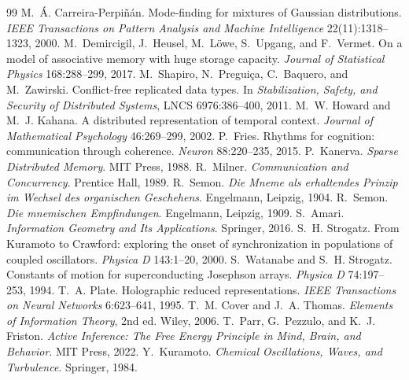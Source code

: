 \documentclass[11pt,twoside,openany]{book}
\theoremstyle{plain}
\theoremstyle{definition}
\theoremstyle{remark}
\theoremstyle{definition}
\begin{document}
\begin{thebibliography}{99}
 M.~\'A. Carreira-Perpi\~n\'an. Mode-finding for mixtures of Gaussian distributions. \emph{IEEE Transactions on Pattern Analysis and Machine Intelligence} 22(11):1318--1323, 2000.
 M.~Demircigil, J.~Heusel, M.~L\"owe, S.~Upgang, and F.~Vermet. On a model of associative memory with huge storage capacity. \emph{Journal of Statistical Physics} 168:288--299, 2017.
 M.~Shapiro, N.~Pregui\c{c}a, C.~Baquero, and M.~Zawirski. Conflict-free replicated data types. In \emph{Stabilization, Safety, and Security of Distributed Systems}, LNCS 6976:386--400, 2011.
 M.~W. Howard and M.~J. Kahana. A distributed representation of temporal context. \emph{Journal of Mathematical Psychology} 46:269--299, 2002.
 P.~Fries. Rhythms for cognition: communication through coherence. \emph{Neuron} 88:220--235, 2015.
 P.~Kanerva. \emph{Sparse Distributed Memory}. MIT Press, 1988.
 R.~Milner. \emph{Communication and Concurrency}. Prentice Hall, 1989.
 R.~Semon. \emph{Die Mneme als erhaltendes Prinzip im Wechsel des organischen Geschehens}. Engelmann, Leipzig, 1904.
 R.~Semon. \emph{Die mnemischen Empfindungen}. Engelmann, Leipzig, 1909.
 S.~Amari. \emph{Information Geometry and Its Applications}. Springer, 2016.
 S.~H. Strogatz. From Kuramoto to Crawford: exploring the onset of synchronization in populations of coupled oscillators. \emph{Physica D} 143:1--20, 2000.
 S.~Watanabe and S.~H. Strogatz. Constants of motion for superconducting Josephson arrays. \emph{Physica D} 74:197--253, 1994.
 T.~A. Plate. Holographic reduced representations. \emph{IEEE Transactions on Neural Networks} 6:623--641, 1995.
 T.~M. Cover and J.~A. Thomas. \emph{Elements of Information Theory}, 2nd ed. Wiley, 2006.
 T.~Parr, G.~Pezzulo, and K.~J. Friston. \emph{Active Inference: The Free Energy Principle in Mind, Brain, and Behavior}. MIT Press, 2022.
 Y.~Kuramoto. \emph{Chemical Oscillations, Waves, and Turbulence}. Springer, 1984.
\end{thebibliography}
\end{document}

